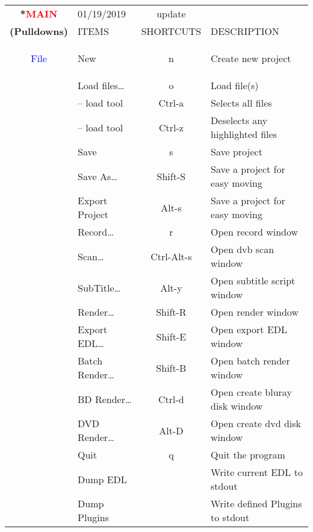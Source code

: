 \begin{center}
    \small
    \begin{longtable}{>{\bfseries}c l c p{6cm}}        
        \toprule
        \multirow{2}*{\textcolor{red}{MAIN}} & 01/19/2019 & update & \\
        \cline{2-4}
        \noalign{\smallskip}
        (Pulldowns) & ITEMS & SHORTCUTS & DESCRIPTION\\        
        \midrule
        \endhead        
        
        \textcolor{blue}{File} & New & n & Create new project \\        
             & Load files\dots & o & Load file(s)\\                          
             & -- load tool & Ctrl-a & Selects all files \\             
             & -- load tool & Ctrl-z & Deselects any highlighted files \\             
             & Save & s & Save project \\             
             & Save As\dots & Shift-S & Save a project for easy moving \\             
             & Export Project & Alt-s & Save a project for easy moving \\             
             & Record\dots & r & Open record window \\             
             & Scan\dots & Ctrl-Alt-s & Open dvb scan window \\             
             & SubTitle\dots & Alt-y & Open subtitle script window \\             
             & Render\dots & Shift-R & Open render window \\             
             & Export EDL\dots & Shift-E & Open export EDL window \\             
             & Batch Render\dots & Shift-B & Open batch render window \\             
             & BD Render\dots & Ctrl-d & Open create bluray disk window \\             
             & DVD Render\dots & Alt-D & Open create dvd disk window \\             
             & Quit & q & Quit the program \\             
             & Dump EDL &  & Write current EDL to stdout \\             
             & Dump Plugins &  & Write defined Plugins to stdout \\             

\end{longtable}
\end{center}
